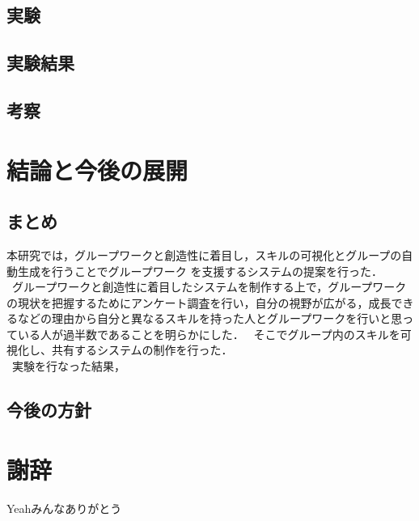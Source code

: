 \documentclass{funthesis}
\begin{document}
\section{実験}

\section{実験結果}




\section{考察}



\chapter{結論と今後の展開}
\section{まとめ}
本研究では，グループワークと創造性に着目し，スキルの可視化とグループの自動生成を行うことでグループワーク
を支援するシステムの提案を行った．\\
\ グループワークと創造性に着目したシステムを制作する上で，グループワークの現状を把握するためにアンケート調査を行い，自分の視野が広がる，成長できるなどの理由から自分と異なるスキルを持った人とグループワークを行いと思っている人が過半数であることを明らかにした．
\ そこでグループ内のスキルを可視化し、共有するシステムの制作を行った．\\
\ 実験を行なった結果，

\section{今後の方針}


\chapter*{謝辞}

Yeahみんなありがとう
\end{document}
